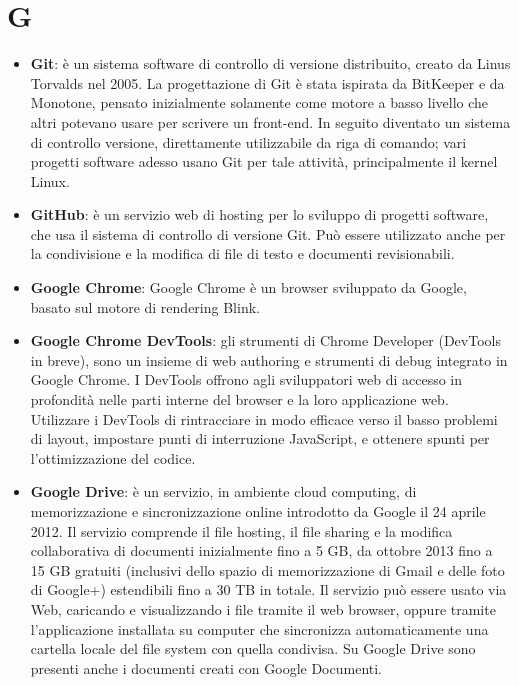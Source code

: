 \section{G}
\begin{itemize}
	\item
	\textbf{Git}: è un sistema software di controllo di versione distribuito, creato da Linus Torvalds nel 2005.
	La progettazione di Git è stata ispirata da BitKeeper e da Monotone, pensato 	inizialmente solamente come motore a basso livello che altri potevano usare per scrivere un front-end. In seguito diventato un sistema di controllo versione, direttamente utilizzabile da riga di comando; vari progetti software adesso usano Git per tale attività, principalmente il kernel Linux.
	\item
	\textbf{GitHub}: è un servizio web di hosting per lo sviluppo di progetti software, che usa il sistema di controllo di versione Git. Può essere utilizzato anche per la condivisione e la modifica di file di testo e documenti revisionabili. 
	\item
	\textbf{Google Chrome}: Google Chrome è un browser sviluppato da Google, basato sul motore di rendering Blink.
	\item
	\textbf{Google Chrome DevTools}: gli strumenti di Chrome Developer (DevTools in breve), sono un insieme di web authoring e strumenti di debug integrato in Google Chrome. I DevTools offrono agli sviluppatori web di accesso in profondità nelle parti interne del browser e la loro applicazione web. Utilizzare i DevTools di rintracciare in modo efficace verso il basso problemi di layout, impostare punti di interruzione JavaScript, e ottenere spunti per l'ottimizzazione del codice.
	\item
	\textbf{Google Drive}: è un servizio, in ambiente cloud computing, di memorizzazione e sincronizzazione online introdotto da Google il 24 aprile 2012. Il servizio comprende il file hosting, il file sharing e la modifica collaborativa di documenti inizialmente fino a 5 GB, da ottobre 2013 fino a 15 GB gratuiti (inclusivi dello spazio di memorizzazione di Gmail e delle foto di Google+) estendibili fino a 30 TB in totale. Il servizio può essere usato via Web, caricando e visualizzando i file tramite il web browser, oppure tramite l'applicazione installata su computer che sincronizza automaticamente una cartella locale del file system con quella condivisa. Su Google Drive sono presenti anche i documenti creati con Google Documenti.
\end{itemize}
